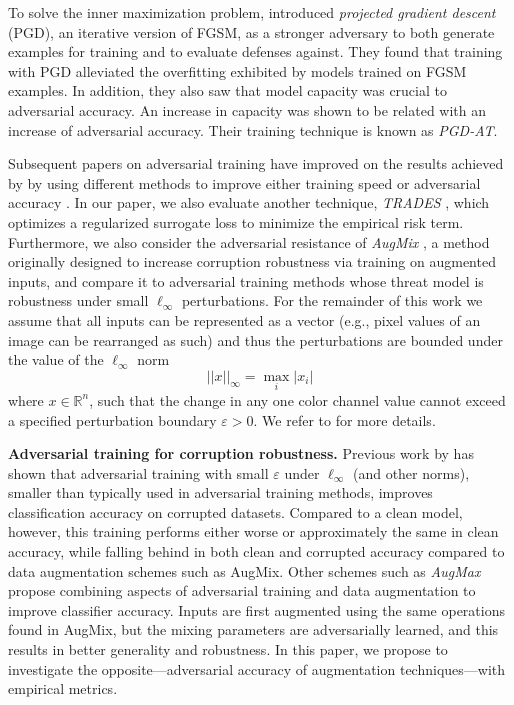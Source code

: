\documentclass[a4paper]{article}
\begin{document}
\noindent
To solve the inner maximization problem,
\textcite{madry2018deeplearningmodelsresistant} introduced \textit{projected
gradient descent} (PGD), an iterative version of FGSM, as a stronger adversary
to both generate examples for training and to evaluate defenses against. They
found that training with PGD alleviated the overfitting exhibited by models
trained on FGSM examples. In addition, they also saw that model capacity was
crucial to adversarial accuracy. An increase in capacity was shown to be related with an increase of adversarial accuracy. Their training technique is known as
\textit{PGD-AT}.

\noindent
Subsequent papers on adversarial training have improved on the results achieved
by \citeauthor{madry2018deeplearningmodelsresistant} by using different methods
to improve either training speed or adversarial accuracy
\cite{bai2021recent}. In our paper, we also evaluate another technique,
\textit{TRADES} \cite{zhang2019trades}, which optimizes a regularized surrogate
loss to minimize the empirical risk term. Furthermore, we also consider the
adversarial resistance of \textit{AugMix} \cite{hendrycks2020augmix}, a method
originally designed to increase corruption robustness via training on augmented
inputs, and compare it to adversarial training methods whose threat model is
robustness under small $\ell_\infty$ perturbations. For the remainder of this work we assume that all inputs can be represented as a vector (e.g., pixel values of an image can be rearranged as
such) and thus the perturbations are bounded under the value of the
$\ell_\infty$ norm
\begin{equation}
||x||_\infty = \max_i |x_i|
\end{equation}
where $x \in \mathbb R^n$, such that the change in any one color channel value
cannot exceed a specified perturbation boundary $\varepsilon > 0$.
We refer to \textcite{goodfellow2015explaining} for more details.

\noindent\textbf{Adversarial training for corruption robustness.}
Previous work by \textcite{kireev2022on} has shown that adversarial training
with small $\varepsilon$ under $\ell_\infty$ (and other norms), smaller than
typically used in adversarial training methods, improves classification accuracy
on corrupted datasets. Compared to a clean model, however, this training
performs either worse or approximately the same in clean accuracy, while falling
behind in both clean and corrupted accuracy compared to data augmentation
schemes such as AugMix. Other schemes such as \textit{AugMax}
\cite{wang2021augmax} propose combining aspects of adversarial training and data
augmentation to improve classifier accuracy. Inputs are first augmented using
the same operations found in AugMix, but the mixing parameters are
adversarially learned, and this results in better generality and robustness. In
this paper, we propose to investigate the opposite—adversarial accuracy of
augmentation techniques—with empirical metrics.
\end{document}

